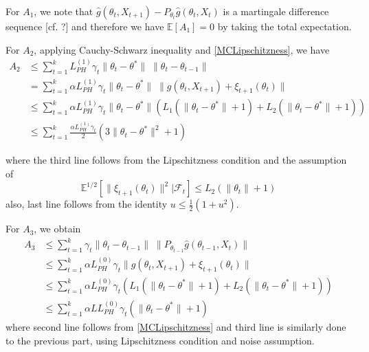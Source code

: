 \documentclass[a4paper]{article}
\newcommand{\norm}[1]{\|#1 \|}
\newcommand{\Exs}{\mathbb{E}}
\newcommand{\thetastar}{\theta^*}
\newcommand{\constLPH}[1]{L_{PH}^{(#1)}}
\newcommand{\stepsize}{\alpha}
\begin{document}
For $A_{1}$, we note that $\hat{g}\left(\theta_{t}, X_{t + 1}\right) - P_{\theta_{t}}\hat{g}\left(\theta_{t}, X_{t}\right)$ is a martingale difference sequence [cf. ?] and therefore we have $\Exs[A_{1}] = 0$ by taking the total expectation.

For $A_{2}$, applying Cauchy-Schwarz inequality and \ref{MCLipschitzness}, we have
\begin{align*}
	A_{2} & \le \sum_{t = 1}^{k}\constLPH{1}\gamma_{t}\norm{\theta_{t} - \thetastar}\;\norm{\theta_{t} - \theta_{t - 1}}\\
	& = \sum_{t = 1}^{k}\stepsize \constLPH{1}\gamma_{t}\norm{\theta_{t} - \thetastar}\;\norm{g(\theta_{t}, X_{t + 1}) + \xi_{t +‌1}(\theta_{t})}\\
	& \le \sum_{t = 1}^{k}\stepsize\constLPH{1} \gamma_{t}\norm{\theta_{t} - \thetastar}\left( L_{1}\left(\norm{\theta_{t} - \thetastar} + 1\right) + L_{2}\left(\norm{\theta_{t} - \thetastar} + 1\right)\right)\\
	& \le \sum_{t = 1}^{k}\frac{\stepsize\constLPH{1}\gamma_{t}}{2}\left(3\norm{\theta_{t} - \thetastar}^{2} + 1\right)
\end{align*}




where the third line follows from the Lipschitzness condition and the assumption of
$$\Exs^{1 / 2}\left[\norm{\xi_{t + 1}\left(\theta_{t}\right)}^{2} | \mathcal{F}_{t}\right] \le L_{2}\left(\norm{\theta_{t}} + 1\right)$$
also, last line follows from the identity $u \le \frac{1}{2}(1 + u^{2})$.

For $A_{3}$, we obtain
\begin{align*}
	A_{3} & \le \sum_{t = 1}^{k}\gamma_{t}\norm{\theta_{t} - \theta_{t - 1}} \; \norm{P_{\theta_{t - 1}}\hat{g}\left(\theta_{t - 1}, X_{t}\right)}\\
	& \le \sum_{t = 1}^{k}\stepsize \constLPH{0}\gamma_{t}\norm{g\left(\theta_{t}, X_{t + 1}\right)‌ + \xi_{t + 1}(\theta_{t})}\\
	& \le \sum_{t = 1}^{k}\stepsize\constLPH{0}\gamma_{t}\left(L_{1}\left(\norm{\theta_{t} - \thetastar} + 1\right) + L_{2}\left(\norm{\theta_{t} - \thetastar} + 1\right)\right)\\
	& \le \sum_{t = 1}^{k}\stepsize L \constLPH{0}\gamma_{t}\left(\norm{\theta_{t} - \thetastar} + 1\right)
\end{align*}
where second line follows from \ref{MCLipschitzness} and third line is similarly done to the previous part, using Lipschitzness condition and noise assumption.
\end{document}
